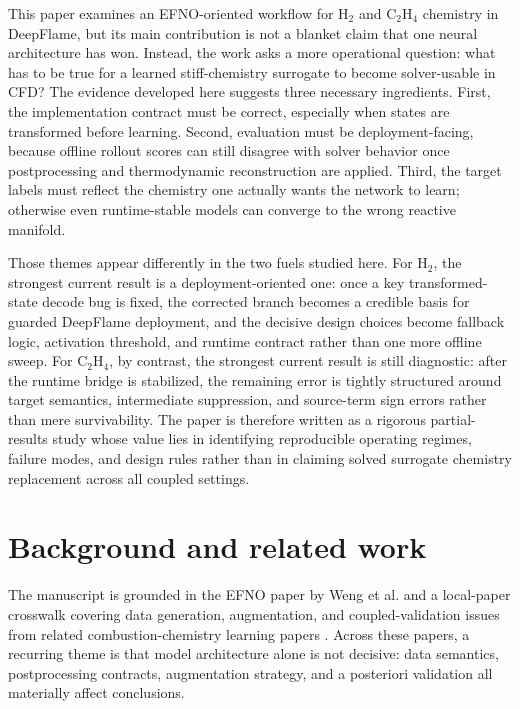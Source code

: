 \documentclass[11pt]{article}
\begin{document}
This paper examines an EFNO-oriented workflow for H$_2$ and C$_2$H$_4$ chemistry in DeepFlame, but its main contribution is not a blanket claim that one neural architecture has won. Instead, the work asks a more operational question: what has to be true for a learned stiff-chemistry surrogate to become solver-usable in CFD? The evidence developed here suggests three necessary ingredients. First, the implementation contract must be correct, especially when states are transformed before learning. Second, evaluation must be deployment-facing, because offline rollout scores can still disagree with solver behavior once postprocessing and thermodynamic reconstruction are applied. Third, the target labels must reflect the chemistry one actually wants the network to learn; otherwise even runtime-stable models can converge to the wrong reactive manifold.

Those themes appear differently in the two fuels studied here. For H$_2$, the strongest current result is a deployment-oriented one: once a key transformed-state decode bug is fixed, the corrected branch becomes a credible basis for guarded DeepFlame deployment, and the decisive design choices become fallback logic, activation threshold, and runtime contract rather than one more offline sweep. For C$_2$H$_4$, by contrast, the strongest current result is still diagnostic: after the runtime bridge is stabilized, the remaining error is tightly structured around target semantics, intermediate suppression, and source-term sign errors rather than mere survivability. The paper is therefore written as a rigorous partial-results study whose value lies in identifying reproducible operating regimes, failure modes, and design rules rather than in claiming solved surrogate chemistry replacement across all coupled settings.

\section{Background and related work}
The manuscript is grounded in the EFNO paper by Weng et al. \cite{weng2025efno} and a local-paper crosswalk covering data generation, augmentation, and coupled-validation issues from related combustion-chemistry learning papers \cite{li2025comprehensive,xiao2026physicsaware,li2026dfodekit,wu2025nh3h2}. Across these papers, a recurring theme is that model architecture alone is not decisive: data semantics, postprocessing contracts, augmentation strategy, and a posteriori validation all materially affect conclusions.
\end{document}
